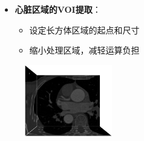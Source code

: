 \begin{frame}
\begin{itemize}
  \item \textbf{心脏区域的VOI提取}：
  \begin{itemize}
  \pause \item 设定长方体区域的起点和尺寸
  \pause \item 缩小处理区域，减轻运算负担
  \end{itemize}
\end{itemize}
\begin{figure}[t]
\centering
\includegraphics[width=1.5in]{../../Figures/coronary/coronary_enhanced/original}
\end{figure}
\end{frame}

